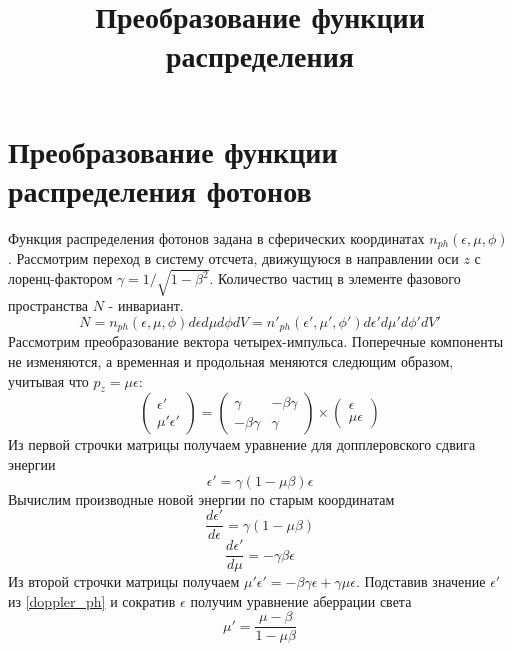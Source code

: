\documentclass[a4paper,12pt]{jpconf}
\begin{document}
	\title{Преобразование функции распределения}
	\section{Преобразование функции распределения фотонов}
	Функция распределения фотонов задана в сферических координатах $n_{ph}(\epsilon,\mu,\phi)$. Рассмотрим переход в систему отсчета, движущуюся в направлении оси $z$ с лоренц-фактором $\gamma = 1/\sqrt{1-\beta^2}$. Количество частиц в элементе фазового пространства $N$ - инвариант.
	\begin{equation}
		N = n_{ph}(\epsilon,\mu,\phi)d\epsilon d\mu d\phi dV = n'_{ph}(\epsilon',\mu',\phi')d\epsilon' d\mu' d\phi' dV'
	\end{equation}
	Рассмотрим преобразование вектора четырех-импульса. Поперечные компоненты не изменяются, а временная и продольная меняются следющим образом, учитывая что $p_z = \mu \epsilon$:
	\begin{equation}\label{lorentz_ph}
		\left(\begin{array}{c}
			\epsilon'\\
			\mu'\epsilon'
		\end{array}
		\right)
		= \left(
		\begin{array}{cc}
			\gamma & -\beta\gamma\\
			-\beta\gamma & \gamma
		\end{array}
		\right)
		\times
		\left(\begin{array}{c}
			\epsilon\\
			\mu\epsilon
		\end{array}
		\right)
	\end{equation}
	Из первой строчки матрицы получаем уравнение для допплеровского сдвига энергии
	\begin{equation}\label{doppler_ph}
		\epsilon'=\gamma(1-\mu\beta)\epsilon
	\end{equation}
	Вычислим производные новой энергии по старым координатам
	\begin{equation}
		\frac{d\epsilon'}{d\epsilon}=\gamma(1-\mu\beta)
	\end{equation}
	\begin{equation}
		\frac{d\epsilon'}{d\mu}=-\gamma\beta\epsilon
	\end{equation}
	Из второй строчки матрицы получаем $\mu'\epsilon'=-\beta\gamma\epsilon+\gamma\mu\epsilon$. Подставив значение $\epsilon'$ из \ref{doppler_ph} и сократив $\epsilon$ получим уравнение аберрации света
	\begin{equation}\label{aberration_ph}
		\mu'=\frac{\mu-\beta}{1-\mu\beta}
	\end{equation}
\end{document}
